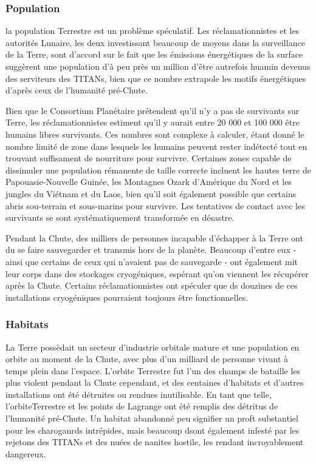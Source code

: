 \subsubsection{Population} \label{sec:population} 

la population Terrestre est un problème spéculatif. Les réclamationnistes et les autorités Lunaire, les deux investissant beaucoup de moyens dans la surveillance de la Terre, sont d'accord sur le fait que les émissions énergétiques de la surface suggèrent une population d'à peu près un million d'être autrefois huamin devenus des serviteurs des TITANs, bien que ce nombre extrapole les motifs énergétiques d'après ceux de l'humanité pré-Chute. 

Bien que le Consortium Planétaire prétendent qu'il n'y a pas de survivants sur Terre, les réclamationnistes estiment qu'il y aurait entre 20 000 et 100 000 être humains libres survivants. Ces nombres sont complexe à calculer, étant donné le nombre limité de zone dans lesquels les humains peuvent rester indétecté tout en trouvant suffisament de nourriture pour survivre. Certaines zones capable de dissimuler une population rémanente de taille correcte incluent les hautes terre de Papouasie-Nouvelle Guinée, les Montagnes Ozark d'Amérique du Nord et les jungles du Viétnam et du Laos, bien qu'il soit également possible que certains abris sou-terrain et sous-marins pour survivre. Les tentatives de contact avec les survivants se sont systématiquement transformée en désastre. 

Pendant la Chute, des milliers de personnes incapable d'échapper à la Terre ont du se faire sauvegarder et transmis hors de la planète. Beaucoup d'entre eux - ainsi que certains de ceux qui n'avaient pas de sauvegarde - ont également mit leur corps dans des stockages cryogéniques, espérant qu'on viennent les récupérer après la Chute. Certains réclamationnistes ont spéculer que ds douzines de ces installations cryogéniques pourraient toujours être fonctionnelles. 

\subsubsection{Habitats} \label{sec:habitats-2} 

La Terre possèdait un secteur d'industrie orbitale mature et une population en orbite au moment de la Chute, avec plus d'un milliard de personne vivant à temps plein dans l'espace. L'orbite Terrestre fut l'un des champs de bataille les plus violent pendant la Chute cependant, et des centaines d'habitats et d'autres installations ont été détruites ou rendues inutilisable. En tant que telle, l'orbiteTerrestre et les points de Lagrange ont été remplis des détritus de l'humanité pré-Chute. Un habitat abandonné peu signifier un proft substantiel pour les charoganrds intrépides, mais beaucoup dsont également infesté par les rejetons des TITANs et des nuées de nanites hostile, les rendant incroyablement dangereux. 

